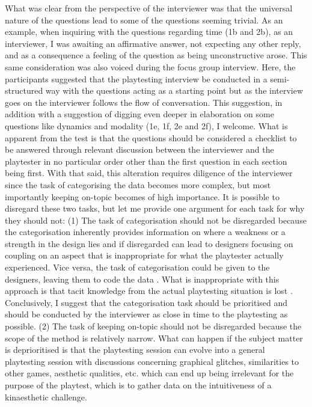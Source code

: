 What was clear from the perspective of the interviewer was that the universal nature of the questions lead to some of the questions seeming trivial. As an example, when inquiring with the questions regarding time (1b and 2b), as an interviewer, I was awaiting an affirmative answer, not expecting any other reply, and as a consequence a feeling of the question as being unconstructive arose. This same consideration was also voiced during the focus group interview. Here, the participants suggested that the playtesting interview be conducted in a semi-structured way with the questions acting as a starting point but as the interview goes on the interviewer follows the flow of conversation. This suggestion, in addition with a suggestion of digging even deeper in elaboration on some questions like dynamics and modality (1e, 1f, 2e and 2f), I welcome. What is apparent from the test is that the questions should be considered a checklist to be answered through relevant discussion between the interviewer and the playtester in no particular order other than the first question in each section being first. With that said, this alteration requires diligence of the interviewer since the task of categorising the data becomes more complex, but most importantly keeping on-topic becomes of high importance. It is possible to disregard these two tasks, but let me provide one argument for each task for why they should not: (1) The task of categorisation should not be disregarded because the categorisation inherently provides information on where a weakness or a strength in the design lies and if disregarded can lead to designers focusing on coupling on an aspect that is inappropriate for what the playtester actually experienced. Vice versa, the task of categorisation could be given to the designers, leaving them to code the data \cite{cresswell}. What is inappropriate with this approach is that tacit knowledge from the actual playtesting situation is lost \cite{cresswell}. Conclusively, I suggest that the categorisation task should be prioritised and should be conducted by the interviewer as close in time to the playtesting as possible. (2) The task of keeping on-topic should not be disregarded because the scope of the method is relatively narrow. What can happen if the subject matter is deprioritised is that the playtesting session can evolve into a general playtesting session with discussions concerning graphical glitches, similarities to other games, aesthetic qualities, etc. which can end up being irrelevant for the purpose of the playtest, which is to gather data on the intuitiveness of a kinaesthetic challenge.

